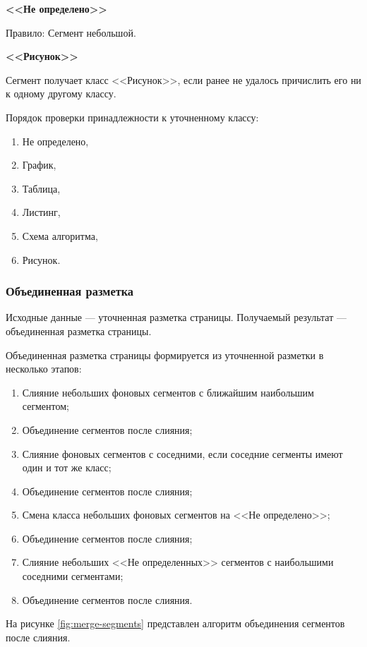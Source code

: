 
\textbf{<<Не определено>>}

Правило: Сегмент небольшой.

\textbf{<<Рисунок>>}

Сегмент получает класс <<Рисунок>>, если ранее не удалось причислить его ни к одному другому классу.

Порядок проверки принадлежности к уточненному классу:
\begin{enumerate}
    \item Не определено,
    \item График,
    \item Таблица,
    \item Листинг,
    \item Схема алгоритма,
    \item Рисунок.
\end{enumerate}

\subsubsection{Объединенная разметка}

Исходные данные --- уточненная разметка страницы.
Получаемый результат --- объединенная разметка страницы.

Объединенная разметка страницы формируется из уточненной разметки в несколько этапов:
\begin{enumerate}
    \item Слияние небольших фоновых сегментов с ближайшим наибольшим сегментом;
    \item Объединение сегментов после слияния;
    \item Слияние фоновых сегментов с соседними, если соседние сегменты имеют один и тот же класс;
    \item Объединение сегментов после слияния;
    \item Смена класса небольших фоновых сегментов на <<Не определено>>;
    \item Объединение сегментов после слияния;
    \item Слияние небольших <<Не определенных>> сегментов с наибольшими соседними сегментами;
    \item Объединение сегментов после слияния.
\end{enumerate}

На рисунке \ref{fig:merge-segments} представлен алгоритм объединения сегментов после слияния.

